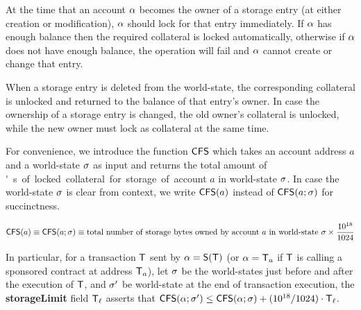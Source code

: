 At the time that an account $\mathbf{\alpha}$ becomes the owner of a storage entry (at either creation or modification), $\mathbf{\alpha}$ should lock \sunitprice for that entry immediately.
If $\mathbf{\alpha}$ has enough balance then the required collateral is locked automatically,
otherwise if $\mathbf{\alpha}$ does not have enough balance, the operation will fail and $\mathbf{\alpha}$ cannot create or change that entry.

When a storage entry is deleted from the world-state, the corresponding \sunitprice collateral is unlocked and returned to the balance of that entry's owner.
In case the ownership of a storage entry is changed, 
the old owner's \sunitprice collateral is unlocked,
while the new owner must lock \sunitprice as collateral at the same time.

For convenience, we introduce the function $\mathsf{CFS}$ which takes an account address $a$ and a world-state $\mathbf{\sigma}$ as input and returns the total amount of \unit's of locked collateral for storage of account $a$ in world-state $\mathbf{\sigma}$.
In case the world-state $\mathbf{\sigma}$ is clear from context, we write $\mathsf{CFS}(a)$ instead of $\mathsf{CFS}(a;\mathbf{\sigma})$ for succinctness.

\begin{align}
	\mathsf{CFS}(a) \equiv \mathsf{CFS}(a;\mathbf{\sigma}) \equiv \text{total number of storage bytes owned by account $a$ in world-state $\mathbf{\sigma}$} 
	\times \frac{10^{18}}{1024}
\end{align}

In particular, 
for a transaction $\textsf{T}$ sent by $\mathbf{\alpha} = \mathsf{S}{\left({\textsf{T}} \right)}$ (or $\mathbf{\alpha}=\textsf{T}_a$ if $\textsf{T}$ is calling a sponsored contract at address $\textsf{T}_a$),
let $\mathbf{\sigma}$ be the world-states just before and after the execution of $\textsf{T}$, and $\mathbf{\sigma}'$ be world-state at the end of transaction execution, the \textbf{storageLimit} field $\textsf{T}_\ell$ asserts that
$\mathsf{CFS}(\mathbf{\alpha};\mathbf{\sigma}')\le \mathsf{CFS}(\mathbf{\alpha};\mathbf{\sigma})+
(10^{18}/1024)\cdot \textsf{T}_\ell$.
